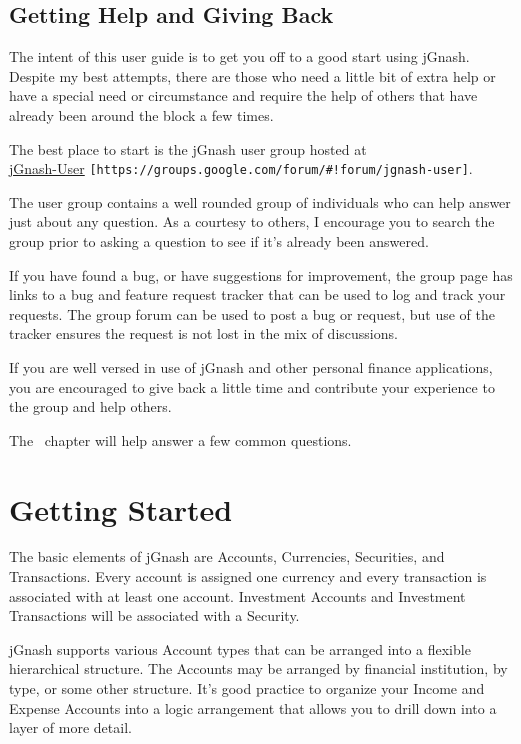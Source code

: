\documentclass[letterpaper,12pt]{book}
\begin{document}
    \section{Getting Help and Giving Back}\label{sec:getting-help-and-giving-back}
    The intent of this user guide is to get you off to a good start using jGnash.
    Despite my best attempts, there are those who need a little bit of extra help or have a special need or
    circumstance and require the help of others that have already been around the block a few times.

    The best place to start is the jGnash user group hosted at \\
    \href{https://groups.google.com/forum/#!forum/jgnash-user}{jGnash-User} \texttt{[https://groups.google.com/forum/\#!forum/jgnash-user]}.

    The user group contains a well rounded group of individuals who can help answer just about any question.
    As a courtesy to others, I encourage you to search the group prior to asking a question to see if it's already
    been answered.

    If you have found a bug, or have suggestions for improvement, the group page has links to a bug and feature request
    tracker that can be used to log and track your requests.
    The group forum can be used to post a bug or request, but use of the tracker ensures the request is not lost in
    the mix of discussions.

    If you are well versed in use of jGnash and other personal finance applications, you are encouraged to give back a
    little time and contribute your experience to the group and help others.

    The~ chapter will help answer a few common questions.

    \chapter{Getting Started}\label{ch:getting-started}
    The basic elements of jGnash are Accounts, Currencies, Securities, and Transactions.
    Every account is assigned one currency and every transaction is associated with at least one account.
    Investment Accounts and Investment Transactions will be associated with a Security.

    jGnash supports various Account types that can be arranged into a flexible hierarchical structure.
    The Accounts may be arranged by financial institution, by type, or some other structure.
    It's good practice to organize your Income and Expense Accounts into a logic arrangement that allows you to drill
    down into a layer of more detail.
\end{document}
